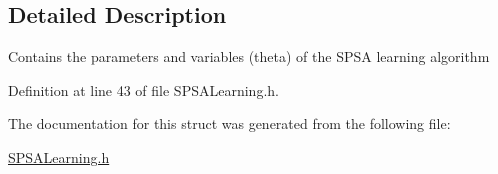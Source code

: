 \subsection{Detailed Description}
Contains the parameters and variables (theta) of the SPSA learning algorithm 

Definition at line 43 of file SPSALearning.h.



The documentation for this struct was generated from the following file:\begin{DoxyCompactItemize}
\item 
\hyperlink{SPSALearning_8h}{SPSALearning.h}\end{DoxyCompactItemize}
